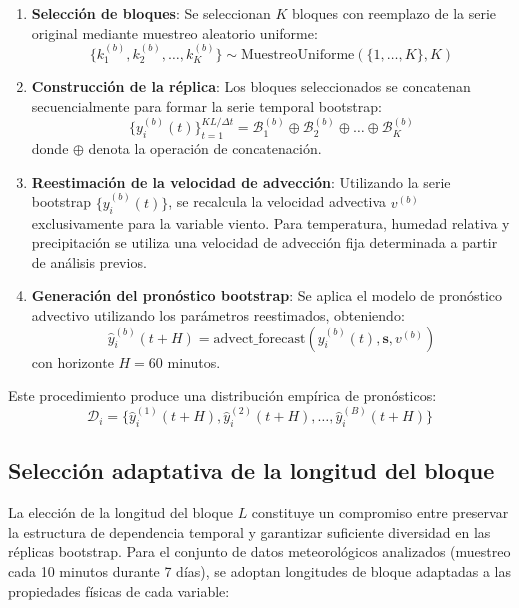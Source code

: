 \documentclass[
  spanish,
  us-letterpaper,
]{scrreprt}
\numberwithin{equation}{section}
\begin{document}
\begin{enumerate}
\def\labelenumi{\arabic{enumi}.}
\item
  \textbf{Selección de bloques}: Se seleccionan \(K\) bloques con
  reemplazo de la serie original mediante muestreo aleatorio uniforme:
  \[
  \{k_1^{(b)}, k_2^{(b)}, \dots, k_K^{(b)}\} \sim \text{MuestreoUniforme}(\{1, \dots, K\}, K)
  \]
\item
  \textbf{Construcción de la réplica}: Los bloques seleccionados se
  concatenan secuencialmente para formar la serie temporal bootstrap: \[
  \{y_i^{(b)}(t)\}_{t=1}^{KL/\Delta t} = \mathcal{B}_1^{(b)} \oplus \mathcal{B}_2^{(b)} \oplus \dots \oplus \mathcal{B}_K^{(b)}
  \] donde \(\oplus\) denota la operación de concatenación.
\item
  \textbf{Reestimación de la velocidad de advección}: Utilizando la
  serie bootstrap \(\{y_i^{(b)}(t)\}\), se recalcula la velocidad
  advectiva \(v^{(b)}\) exclusivamente para la variable viento. Para
  temperatura, humedad relativa y precipitación se utiliza una velocidad
  de advección fija determinada a partir de análisis previos.
\item
  \textbf{Generación del pronóstico bootstrap}: Se aplica el modelo de
  pronóstico advectivo utilizando los parámetros reestimados,
  obteniendo: \[
  \hat{y}_i^{(b)}(t+H) = \text{advect\_forecast}\left(y_i^{(b)}(t), \mathbf{s}, v^{(b)}\right)
  \] con horizonte \(H = 60\) minutos.
\end{enumerate}

Este procedimiento produce una distribución empírica de pronósticos: \[
\mathcal{D}_i = \{\hat{y}_i^{(1)}(t+H), \hat{y}_i^{(2)}(t+H), \dots, \hat{y}_i^{(B)}(t+H)\}
\]

\subsection{Selección adaptativa de la longitud del
bloque}\label{selecciuxf3n-adaptativa-de-la-longitud-del-bloque}

La elección de la longitud del bloque \(L\) constituye un compromiso
entre preservar la estructura de dependencia temporal y garantizar
suficiente diversidad en las réplicas bootstrap. Para el conjunto de
datos meteorológicos analizados (muestreo cada 10 minutos durante 7
días), se adoptan longitudes de bloque adaptadas a las propiedades
físicas de cada variable:
\end{document}
